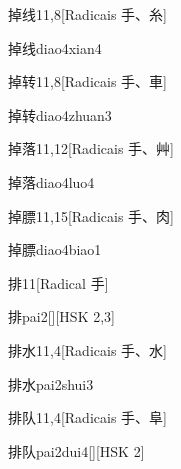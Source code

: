 \begin{entry}{掉线}{11,8}[Radicais ⼿、⽷]
  \begin{phonetics}{掉线}{diao4xian4}
  \end{phonetics}
\end{entry}

\begin{entry}{掉转}{11,8}[Radicais ⼿、⾞]
  \begin{phonetics}{掉转}{diao4zhuan3}
  \end{phonetics}
\end{entry}

\begin{entry}{掉落}{11,12}[Radicais ⼿、⾋]
  \begin{phonetics}{掉落}{diao4luo4}
  \end{phonetics}
\end{entry}

\begin{entry}{掉膘}{11,15}[Radicais ⼿、⾁]
  \begin{phonetics}{掉膘}{diao4biao1}
  \end{phonetics}
\end{entry}

\begin{entry}{排}{11}[Radical ⼿]
  \begin{phonetics}{排}{pai2}[][HSK 2,3]
  \end{phonetics}
\end{entry}

\begin{entry}{排水}{11,4}[Radicais ⼿、⽔]
  \begin{phonetics}{排水}{pai2shui3}
  \end{phonetics}
\end{entry}

\begin{entry}{排队}{11,4}[Radicais ⼿、⾩]
  \begin{phonetics}{排队}{pai2dui4}[][HSK 2]
  \end{phonetics}
\end{entry}


